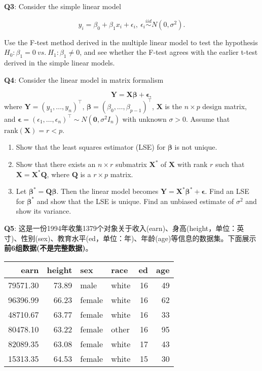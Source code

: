 \documentclass[]{article}
\begin{document}
\textbf{Q3}: Consider the simple linear model

\[y_i= \beta_0+\beta_1x_i+\epsilon_i,\ \epsilon_i\stackrel{iid}{\sim} N(0,\sigma^2).\]

Use the F-test method derived in the multiple linear model to test the
hypothesis \(H_0:\beta_1=0\ vs.\ H_1:\beta_1\neq 0\), and see whether
the F-test agrees with the earlier t-test derived in the simple linear
models.

\textbf{Q4}: Consider the linear model in matrix formalism

\[
\boldsymbol{Y} = \boldsymbol{X}\boldsymbol {\beta} + \boldsymbol\epsilon,
\] where \(\boldsymbol Y=(y_1,\dots,y_n)^\top\),
\(\boldsymbol\beta=(\beta_0,\dots,\beta_{p-1})^\top\), \(\boldsymbol X\)
is the \(n\times p\) design matrix, and
\(\boldsymbol\epsilon=(\epsilon_1,\dots,\epsilon_n)^\top\sim N(\boldsymbol 0,\sigma^2 I_n)\)
with unknown \(\sigma>0\). Assume that
\(\mathrm{rank}(\boldsymbol{X})=r<p\).

\begin{enumerate}
\def\labelenumi{(\alph{enumi})}
\item
  Show that the least squares estimator (LSE) for \(\boldsymbol\beta\)
  is not unique.
\item
  Show that there exists an \(n\times r\) submatrix \(\boldsymbol{X}^*\)
  of \(\boldsymbol{X}\) with rank \(r\) such that
  \(\boldsymbol{X}=\boldsymbol{X}^*\boldsymbol{Q}\), where
  \(\boldsymbol{Q}\) is a \(r\times p\) matrix.
\item
  Let \(\boldsymbol\beta^* = \boldsymbol{Q\beta}\). Then the linear
  model becomes
  \(\boldsymbol{Y} = \boldsymbol{X}^*\boldsymbol {\beta}^* + \boldsymbol\epsilon\).
  Find an LSE for \(\boldsymbol\beta^*\) and show that the LSE is
  unique. Find an unbiased estimate of \(\sigma^2\) and show its
  variance.
\end{enumerate}

\textbf{Q5}:
这是一份1994年收集1379个对象关于收入(earn)、身高(height，单位：英寸)、性别(sex)、教育水平(ed，单位：年)、年龄(age)等信息的数据集。下面展示\textbf{前6组数据(不是完整数据)}。

\begin{longtable}[]{@{}rrllrr@{}}
\toprule
earn & height & sex & race & ed & age\tabularnewline
\midrule
\endhead
79571.30 & 73.89 & male & white & 16 & 49\tabularnewline
96396.99 & 66.23 & female & white & 16 & 62\tabularnewline
48710.67 & 63.77 & female & white & 16 & 33\tabularnewline
80478.10 & 63.22 & female & other & 16 & 95\tabularnewline
82089.35 & 63.08 & female & white & 17 & 43\tabularnewline
15313.35 & 64.53 & female & white & 15 & 30\tabularnewline
\bottomrule
\end{longtable}
\end{document}
